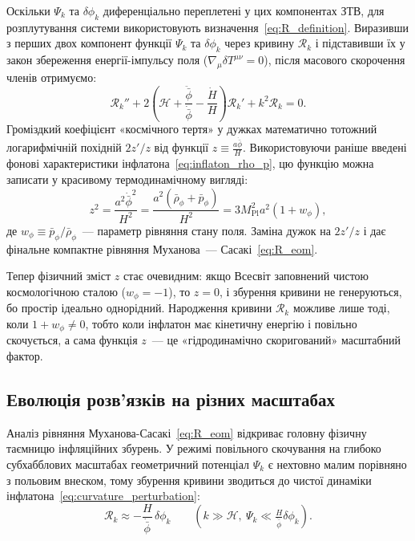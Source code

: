 \begin{mathbox}
    Оскільки $\Psi_k$ та $\delta\phi_k$ диференціально переплетені у цих компонентах ЗТВ, для розплутування системи
    використовують визначення~\eqref{eq:R_definition}. Виразивши з перших двох компонент функції $\Psi_k$ та $\delta\phi_k$
    через кривину $\mathcal{R}_k$ і підставивши їх у закон збереження енергії-імпульсу поля ($\nabla_\mu \delta T^{\mu\nu}=0$),
    після масового скорочення членів отримуємо:
    \begin{equation*}
      \mathcal{R}_k'' + 2\left(\mathcal{H} + \frac{\ddot{\bar\phi}}{\dot{\bar\phi}} - \frac{\dot{H}}{H}\right)\mathcal{R}_k' + k^2\mathcal{R}_k = 0.
    \end{equation*}
    Громіздкий коефіцієнт «космічного тертя» у дужках математично тотожний логарифмічній похідній $2z'/z$ від функції
    $z \equiv \frac{a\dot{\bar\phi}}{H}$. Використовуючи раніше введені фонові характеристики інфлатона~\eqref{eq:inflaton_rho_p},
    цю функцію можна записати у красивому термодинамічному вигляді:
    \begin{equation*}
       z^2 = \frac{a^2 \dot{\bar{\phi}}^2}{H^2} = \frac{a^2 (\bar{\rho}_\phi + \bar{p}_\phi)}{H^2} = 3 M_{\mathrm{Pl}}^2 a^2 (1 + w_\phi),
    \end{equation*}
    де $w_\phi \equiv \bar{p}_\phi / \bar{\rho}_\phi$~--- параметр рівняння стану поля. Заміна дужок на $2z'/z$ і дає
    фінальне компактне рівняння Муханова~--- Сасакі~\eqref{eq:R_eom}.

    Тепер фізичний зміст $z$ стає очевидним: якщо Всесвіт заповнений чистою космологічною сталою ($w_\phi = -1$), то $z = 0$, і збурення кривини не генеруються, бо простір ідеально однорідний. Народження кривини $\mathcal{R}_k$ можливе лише тоді, коли $1 + w_\phi \neq 0$, тобто коли інфлатон має кінетичну енергію і повільно скочується, а сама функція $z$~--- це «гідродинамічно скоригований» масштабний фактор.
\end{mathbox}


\subsection*{Еволюція розв'язків на різних масштабах}

Аналіз рівняння Муханова-Сасакі~\eqref{eq:R_eom} відкриває
головну фізичну таємницю інфляційних збурень. У режимі
повільного скочування на глибоко субхабблових масштабах
геометричний потенціал $\Psi_k$ є нехтовно малим порівняно
з польовим внеском, тому збурення кривини зводиться до
чистої динаміки інфлатона~\eqref{eq:curvature_perturbation}:
\begin{equation}\label{eq:curvature_perturbation}
  \mathcal{R}_k \approx -\frac{H}{\dot{\bar{\phi}}}\,\delta\phi_k
  \qquad (k \gg \mathcal{H},\ \Psi_k \ll \tfrac{H}{\dot{\bar\phi}}\delta\phi_k).
\end{equation}


